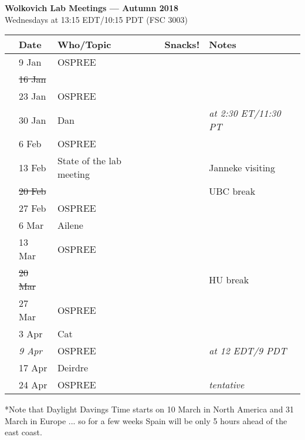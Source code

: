 \documentclass[11pt]{article}
\begin{document}
 
\raggedright
{}

\begin{center} 
{\large \textbf{Wolkovich Lab Meetings --- Autumn 2018}} \\ [2pt]
Wednesdays at 13:15 EDT/10:15 PDT (FSC 3003)\\
\end{center} 

\begin{center}
\begin{tabular}{ p{0.2 cm}  p{2 cm}  p{5 cm}  p{2 cm}  p{4 cm} }  \hline \hline
 & \textbf{Date}
   & \textbf{Who/Topic}
      & \textbf{Snacks!} 
         & \textbf{Notes} \\ 
\hline \hline
 & 9 Jan & OSPREE &       &  \\\hline
 & \sout{16 Jan} & &       &  \\\hline
 & 23 Jan & OSPREE &       &  \\\hline
 & 30 Jan & Dan &       & \emph{at 2:30 ET/11:30 PT} \\\hline  %
 &6 Feb & OSPREE &       &  \\\hline
 & 13 Feb & State of the lab meeting  &       &  Janneke visiting\\\hline
 & \sout{20 Feb} & &     & UBC break \\\hline
 & 27 Feb& OSPREE &       &  \\\hline %
 & 6 Mar  & Ailene &       &  \\\hline
 & 13 Mar & OSPREE &       &  \\\hline
 & \sout{20 Mar} &  &       &  HU break \\\hline
 & 27 Mar & OSPREE &       &  \\\hline
 & 3 Apr & Cat &       &  \\\hline
 & \emph{9 Apr} & OSPREE &   & \emph{at 12 EDT/9 PDT } \\\hline
 & 17 Apr & Deirdre &       &  \\\hline
 & 24 Apr & OSPREE &       & \emph{tentative} \\\hline


\hline
\end{tabular}
\end{center}
*Note that Daylight Davings Time starts on 10 March in North America and 31 March in Europe ... so for a few weeks Spain will be only 5 hours ahead of the east coast.
\end{document}
